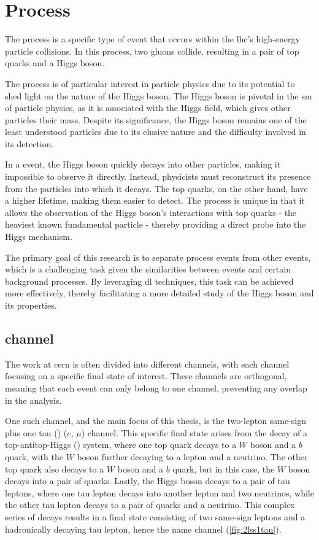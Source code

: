 \section{\tth Process}

The \tth process is a specific type of event that occurs within the \gls{lhc}'s high-energy
particle collisions. In this process, two gluons collide, resulting in a pair of top quarks and a Higgs boson.

The \tth process is of particular interest in particle physics due to its potential to shed light on the nature of the
Higgs boson. The Higgs boson is pivotal in the \gls{sm} of particle physics, as it is associated with the Higgs
field, which gives other particles their mass. Despite its significance, the Higgs boson remains one of the least
understood particles due to its elusive nature and the difficulty involved in its detection.

In a \tth event, the Higgs boson quickly decays into other particles, making it impossible to observe it directly. Instead,
physicists must reconstruct its presence from the particles into which it decays. The top quarks, on the other hand,
have a higher lifetime, making them easier to detect. The \tth process is unique in that it allows the observation of the
Higgs boson's interactions with top quarks - the heaviest known fundamental particle - thereby providing a direct probe
into the Higgs mechanism.

The primary goal of this research is to separate \tth process events from other events, which is a challenging task given
the similarities between \tth events and certain background processes. By leveraging \gls{dl} techniques, this task can
be achieved more effectively, thereby facilitating a more detailed study of the Higgs boson and its properties.

\subsection{\lss channel}
\label{sec:lss}



The work at \gls{cern} is often divided into different channels, with each channel focusing on a specific final state of
interest. These channels are orthogonal, meaning that each event can only belong to one channel, preventing any overlap
in the analysis.

One such channel, and the main focus of this thesis, is the two-lepton same-sign plus one tau (\lss) ($e$, $\mu$)
channel. This specific final state arises from the decay of a top-antitop-Higgs (\tth) system, where one top quark
decays to a $W$ boson and a $b$ quark, with the $W$ boson further decaying to a lepton and a neutrino. The other top
quark also decays to a $W$ boson and a $b$ quark, but in this case, the $W$ boson decays into a pair of quarks. Lastly,
the Higgs boson decays to a pair of tau leptons, where one tau lepton decays into another lepton and two neutrinos,
while the other tau lepton decays to a pair of quarks and a neutrino. This complex series of decays results in a final
state consisting of two same-sign leptons and a hadronically decaying tau lepton, hence the name \lss channel
(\autoref{fig:2lss1tau}).


